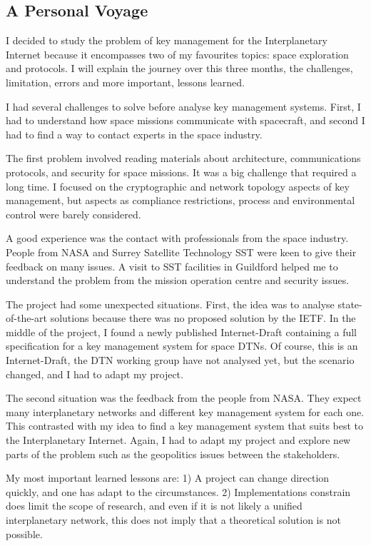 \subsection{A Personal Voyage}

I decided to study the problem of key management for the Interplanetary Internet because it encompasses two of my favourites topics: space exploration and protocols.  I will explain the journey over this three months, the challenges, limitation, errors and more important, lessons learned.


I had several challenges to solve before analyse key management systems. First, I had to understand how space missions communicate with spacecraft, and second I had to find a way to contact experts in the space industry. 

The first problem involved reading materials about architecture, communications protocols, and security for space missions. It was a big challenge that required a long time. I focused on the cryptographic and network topology aspects of key management, but aspects as compliance restrictions, process and environmental control were barely considered.


A good experience was the contact with professionals from the space industry. People from NASA and Surrey Satellite Technology SST were keen to give their feedback on many issues. A visit to SST facilities in Guildford helped me to understand the problem from the mission operation centre and security issues. 

The project had some unexpected situations. First, the idea was to analyse state-of-the-art solutions because there was no proposed solution by the IETF. In the middle of the project, I found a newly published Internet-Draft containing a full specification for a key management system for space DTNs. Of course, this is an Internet-Draft,  the DTN working group have not analysed yet, but the scenario changed, and I had to adapt my project. 

The second situation was the feedback from the people from NASA. They expect many interplanetary networks and different key management system for each one. This contrasted with my idea to find a key management system that suits best to the Interplanetary Internet. Again, I had to adapt my project and explore new parts of the problem such as the geopolitics issues between the stakeholders.

My most important learned lessons are: 1) A project can change direction quickly, and one has adapt to the circumstances. 2) Implementations constrain does limit the scope of research, and even if it is not likely a unified interplanetary network, this does not imply that a theoretical solution is not possible. 

